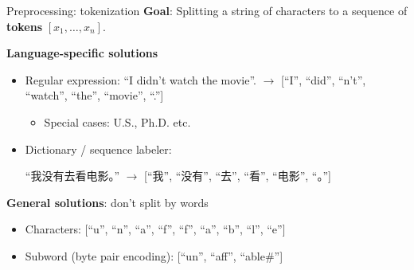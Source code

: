 \documentclass[usenames,dvipsnames,notes,11pt,aspectratio=169]{beamer}
\newcommand{\pdfnote}[1]{}
\begin{document}
\begin{frame}
    {Preprocessing: tokenization}
    \textbf{Goal}: Splitting a string of characters to a sequence of \textbf{tokens} $[x_1, \ldots, x_n]$.

    \medskip
    \textbf{Language-specific solutions}\\
    \begin{itemize}
        \itemsep1em
        \item Regular expression: ``I didn't watch the movie''. $\rightarrow$ [``I'', ``did'', ``n't'', ``watch'', ``the'', ``movie'', ``.''] 
            \begin{itemize}
                \item Special cases: U.S., Ph.D. etc.
            \end{itemize}
        \item Dictionary / sequence labeler: 
            \begin{CJK*}{UTF8}{gbsn}
                ``我没有去看电影。'' $\rightarrow$ [``我'', ``没有'', ``去'', ``看'', ``电影'', ``。'']
            \end{CJK*}
    \end{itemize}

    \medskip
    \pause
    \textbf{General solutions}: don't split by words\\
    \begin{itemize}
        \item Characters:
            [``u'', ``n'', ``a'', ``f'', ``f'', ``a'', ``b'', ``l'', ``e''] 
        \item Subword (\eg byte pair encoding):
            [``un'', ``aff'', ``able\#'']
    \end{itemize}
    \pdfnote{
        Note that for contractions like didn't. We can tokenize it into either did n't or didn 't. Both are okay as long as it's consistent.
        English tokenization gets more complex when there is punctuations or special symbols.
    }
    \pdfnote{Tokenization can have important impact on the performance of downstream learning algorithms.
    }
    \pdfnote{
        Using character sequences (or even byte sequences) we impose mininal prior knowledge on what is a word. Given enough data, the model can probably figure out a reasonable unit of the characters based on their frequencies. But one downside in this approach is that the sequence is now much longer, and the computation time of many algorithms grows with sequence length, which will be expensive for large-scale training.
    }
    \pdfnote{
        A middle ground is to use subword, a unit larger than characters but smaller than words.
        This is commonly used in large-scale models nowadays.
        The BPE algorithms is a simple technique from data compression.
        The basic idea is to recursively merge frequently adjacent symbols into a new symbol (or token).
        The subword found through this algorithm often corresponds to morphemes.
    }
\end{frame}
\end{document}
